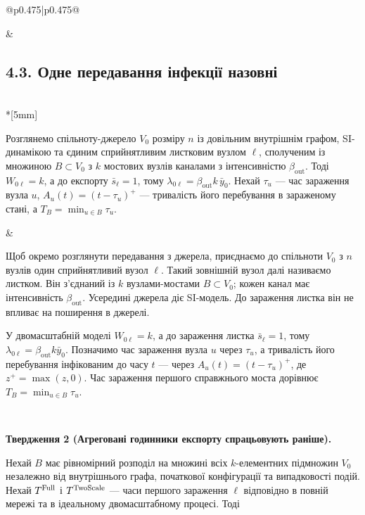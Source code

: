 \documentclass[11pt]{article}
\newcommand{\ibar}{\bar{y}}
\newcommand{\sbar}{\bar{s}}
\newcommand{\Full}{\textnormal{Full}}
\newcommand{\TS}{\textnormal{TwoScale}}
\begin{document}
\begin{longtable}{@{}p{0.475\textwidth}|p{0.475\textwidth}@{}}
\begin{minipage}[t]{\linewidth}
\end{minipage} &
\begin{minipage}[t]{\linewidth}
\subsection*{4.3. Одне передавання інфекції назовні}

\end{minipage} \\*[5mm]
\begin{minipage}[t]{\linewidth}
Розглянемо спільноту-джерело $V_0$ розміру $n$ із довільним внутрішнім графом, SI-динамікою та єдиним сприйнятливим листковим вузлом $\ell$, сполученим із множиною $B\subset V_0$ з $k$ мостових вузлів каналами з інтенсивністю $\beta_{\mathrm{out}}$. Тоді $W_{0\ell}=k$, а до експорту $\sbar_\ell=1$, тому $\lambda_{0\ell}=\beta_{\mathrm{out}}k\,\ibar_0$. Нехай $\tau_u$ --- час зараження вузла $u$, $A_u(t)=(t-\tau_u)^+$ --- тривалість його перебування в зараженому стані, а $T_B=\min_{u\in B}\tau_u$.
\end{minipage} &
\begin{minipage}[t]{\linewidth}
Щоб окремо розглянути передавання з джерела, приєднаємо до спільноти $V_0$ з $n$ вузлів один сприйнятливий вузол $\ell$. Такий зовнішній вузол далі називаємо листком. Він з'єднаний із $k$ вузлами-мостами $B\subset V_0$; кожен канал має інтенсивність $\beta_{\mathrm{out}}$. Усередині джерела діє SI-модель. До зараження листка він не впливає на поширення в джерелі.
\par У двомасштабній моделі $W_{0\ell}=k$, а до зараження листка $\sbar_\ell=1$, тому $\lambda_{0\ell}=\beta_{\mathrm{out}}k\ibar_0$. Позначимо час зараження вузла $u$ через $\tau_u$, а тривалість його перебування інфікованим до часу $t$ --- через $A_u(t)=(t-\tau_u)^+$, де $z^+=\max(z,0)$. Час зараження першого справжнього моста дорівнює $T_B=\min_{u\in B}\tau_u$.
\end{minipage} \\[5mm]
\begin{minipage}[t]{\linewidth}
\par\noindent\textbf{Твердження 2 (Агреговані годинники експорту спрацьовують раніше).}\par\noindent 
Нехай $B$ має рівномірний розподіл на множині всіх $k$-елементних підмножин $V_0$ незалежно від внутрішнього графа, початкової конфігурації та випадковості подій. Нехай $T^{\Full}$ і $T^{\TS}$ --- часи першого зараження $\ell$ відповідно в повній мережі та в ідеальному двомасштабному процесі. Тоді

\end{minipage}
\end{longtable}
\end{document}
